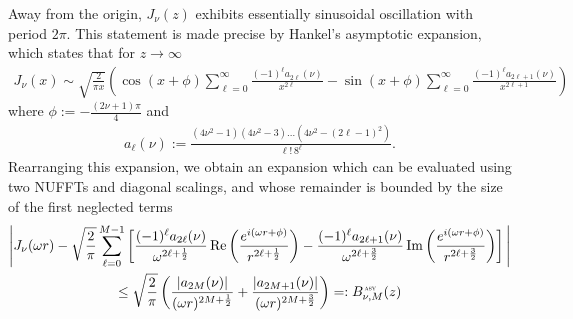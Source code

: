 Away from the origin, $J_\nu(z)$ exhibits essentially sinusoidal oscillation
with period $2\pi$. This statement is made precise by Hankel's asymptotic
expansion, which states that for $z \to \infty$
\begin{align} \label{eq:asymptotic-expansion}
    J_\nu(x)
    \sim \sqrt{\frac{2}{\pi x}} \left( 
        \cos\left(x + \phi\right) \sum_{\ell=0}^{\infty} \frac{(-1)^\ell a_{2\ell}(\nu)}{x^{2\ell}}
        - \sin\left(x + \phi\right) \sum_{\ell=0}^{\infty} \frac{(-1)^\ell a_{2\ell+1}(\nu)}{x^{2\ell+1}}
        \right)
\end{align}
where $\phi := - \frac{(2\nu+1)\pi}{4}$ and 
\begin{align}
    a_\ell(\nu) := \frac{(4\nu^2 - 1)(4\nu^2 - 3)\dots(4\nu^2 -
  (2\ell-1)^2)}{\ell! \, 8^\ell}.
\end{align}
Rearranging this expansion, we obtain an expansion which can be evaluated using
two NUFFTs and diagonal scalings, and whose remainder is bounded by the size of
the first neglected terms~\cite[Section 7.3]{watson1922treatise}
\begin{multline} \label{eq:asy-error}
    \Bigg| J_\nu(\omega r)
    - \sqrt{\frac{2}{\pi}} \sum_{\ell=0}^{M-1} \left[  
        \frac{(-1)^\ell a_{2\ell}(\nu)}{\omega^{2\ell + \frac{1}{2}}} \Re\left(
          \frac{e^{i(\omega r + \phi)}}{r^{2\ell+\frac{1}{2}}}\right)  - \frac{(-1)^\ell
            a_{2\ell+1}(\nu)}{\omega^{2\ell+\frac{3}{2}}}
          \Im\left(\frac{e^{i(\omega r + \phi)}}{r^{2\ell+\frac{3}{2}}} \right) \right]
        \Bigg| \\
         \leq \sqrt{\frac{2}{\pi}} \left( \frac{\abs{a_{2M}(\nu)}}{(\omega r)^{2M+\frac{1}{2}}} + \frac{\abs{a_{2M+1}(\nu)}}{(\omega r)^{2M+\frac{3}{2}}} \right) =: \Basy(z)
\end{multline}

